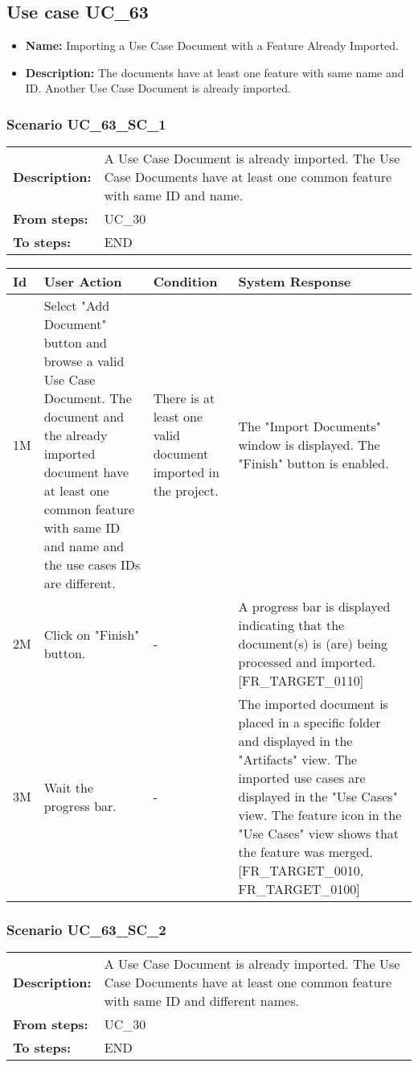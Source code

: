 \documentclass[a4paper,11pt]{article}
\newcommand{\bl}{\\ \hline}
\begin{document}
\subsection*{Use case UC_63}
\begin{itemize}
\item {\bf Name: }Importing a Use Case Document with a Feature Already Imported.
\item {\bf Description: }The documents have at least one feature with same name and ID. Another Use Case Document is already imported.
\end{itemize}
\subsubsection*{Scenario UC_63_SC_1}
\begin{tabular}{p{1in}p{4in}}
{\bf Description:} & A Use Case Document is already imported. The Use Case Documents have at least one common feature with same ID and name. \\
{\bf From steps:} & UC_30#2M \\
{\bf To steps:} & END \\
\end{tabular}
 
\begin{tabular}{|p{0.8in}|p{1.6in}|p{1.6in}|p{1.6in}|}
\hline
Id & User Action & Condition & System Response  \bl 
1M & Select "Add Document" button and browse a valid Use Case Document. The document and the already imported document have at least one common feature with same ID and name and the use cases IDs are different. & There is at least one valid document imported in the project. & The "Import Documents" window is displayed. The "Finish" button is enabled. \bl 
2M & Click on "Finish" button. & - & A progress bar is displayed indicating that the document(s) is (are) being processed and imported. [FR_TARGET_0110] \bl 
3M & Wait the progress bar. & - & The imported document is placed in a specific folder and displayed in the "Artifacts" view. The imported use cases are displayed in the "Use Cases" view. The feature icon in the "Use Cases" view shows that the feature was merged. [FR_TARGET_0010, FR_TARGET_0100] \bl 
\end{tabular}
\subsubsection*{Scenario UC_63_SC_2}
\begin{tabular}{p{1in}p{4in}}
{\bf Description:} & A Use Case Document is already imported. The Use Case Documents have at least one common feature with same ID and different names. \\
{\bf From steps:} & UC_30#2M \\
{\bf To steps:} & END \\
\end{tabular}
 
\end{document}
